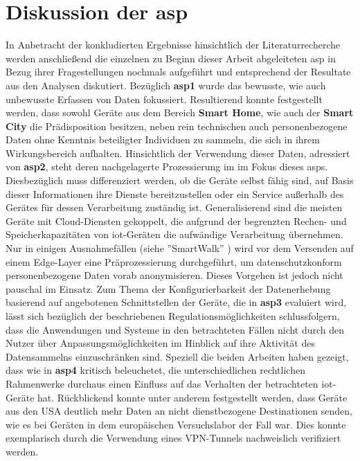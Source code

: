 
\section{Diskussion der \acl{asp}}
\label{sec:Hauptteil:ssec:Diskussion der Aspekte}

In Anbetracht der konkludierten Ergebnisse hinsichtlich der Literaturrecherche werden anschließend die einzelnen zu Beginn dieser Arbeit abgeleiteten \acl{asp} in Bezug ihrer Fragestellungen nochmals aufgeführt und entsprechend der Resultate aus den Analysen diskutiert. Bezüglich \textbf{\ac{asp}1} wurde das bewusste, wie auch unbewusste Erfassen von Daten fokussiert. Resultierend konnte festgestellt werden, dass sowohl Geräte aus dem Bereich \textbf{Smart Home}, wie auch der \textbf{Smart City} die Prädisposition besitzen, neben rein technischen auch personenbezogene Daten ohne Kenntnis beteiligter Individuen zu sammeln, die sich in ihrem Wirkungsbereich aufhalten. 
Hinsichtlich der Verwendung dieser Daten, adressiert von \textbf{\ac{asp}2}, steht deren nachgelagerte Prozessierung im im Fokus dieses \aclp{asp}. Diesbezüglich muss differenziert werden, ob die Geräte selbst fähig sind, auf Basis dieser Informationen ihre Dienste bereitzustellen oder ein Service außerhalb des Gerätes für dessen Verarbeitung zuständig ist. Generalisierend sind die meisten Geräte mit Cloud-Diensten gekoppelt, die aufgrund der begrenzten Rechen- und Speicherkapazitäten von \ac{iot}-Geräten die aufwändige Verarbeitung übernehmen. Nur in einigen Ausnahmefällen (siehe ''SmartWalk'' \cite{Natix2022}) wird vor dem Versenden auf einem Edge-Layer eine Präprozessierung durchgeführt, um datenschutzkonform personenbezogene Daten vorab anonymisieren. Dieses Vorgehen ist jedoch nicht pauschal im Einsatz. 
Zum Thema der Konfigurierbarkeit der Datenerhebung basierend auf angebotenen Schnittstellen der Geräte, die in \textbf{\ac{asp}3} evaluiert wird, lässt sich bezüglich der beschriebenen Regulationsmöglichkeiten schlussfolgern, dass die Anwendungen und Systeme in den betrachteten Fällen nicht durch den Nutzer über Anpassungsmöglichkeiten im Hinblick auf ihre Aktivität des Datensammelns einzuschränken sind. 
Speziell die beiden Arbeiten \cite{Mandalari2021,Ren2019} haben gezeigt, dass wie in \textbf{\ac{asp}4} kritisch beleuchetet, die unterschiedlichen rechtlichen Rahmenwerke durchaus einen Einfluss auf das Verhalten der betrachteten \ac{iot}-Geräte hat. Rückblickend konnte unter anderem festgestellt werden, dass Geräte aus den USA deutlich mehr Daten an nicht dienstbezogene Destinationen senden, wie es bei Geräten in dem europäischen Versuchslabor der Fall war. Dies konnte exemplarisch durch die Verwendung eines VPN-Tunnels nachweislich verifiziert werden. 
